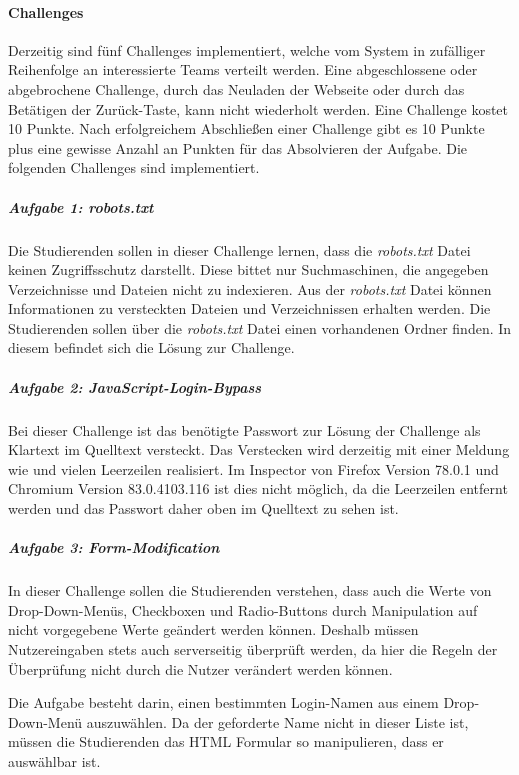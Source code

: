 \paragraph{Challenges} \label{para:Challenges}
Derzeitig sind fünf Challenges implementiert, welche vom System in zufälliger Reihenfolge an interessierte Teams verteilt werden. Eine abgeschlossene oder abgebrochene Challenge, durch das Neuladen der Webseite oder durch das Betätigen der Zurück-Taste, kann nicht wiederholt werden. Eine Challenge kostet 10 Punkte. Nach erfolgreichem Abschließen einer Challenge gibt es 10 Punkte plus eine gewisse Anzahl an Punkten für das Absolvieren der Aufgabe. Die folgenden Challenges sind implementiert. \cite[S.19-20]{abtsUeberarbeitungUndErweiterung2016}

\subparagraph{Aufgabe 1: robots.txt}\label{subpara:Aufgabe_1_robots.txt}
Die Studierenden sollen in dieser Challenge lernen, dass die \textit{robots.txt} Datei keinen Zugriffsschutz darstellt. Diese bittet nur Suchmaschinen, die angegeben Verzeichnisse und Dateien nicht zu indexieren. Aus der \textit{robots.txt} Datei können Informationen zu versteckten Dateien und Verzeichnissen erhalten werden. Die Studierenden sollen über die \textit{robots.txt} Datei einen vorhandenen Ordner finden. In diesem befindet sich die Lösung zur Challenge.

\subparagraph{Aufgabe 2: JavaScript-Login-Bypass}\label{subpara:Aufgabe_2_JavaScript-Login-Bypass}
Bei dieser Challenge ist das benötigte Passwort zur Lösung der Challenge als Klartext im Quelltext versteckt. Das Verstecken wird derzeitig mit einer Meldung wie  und vielen Leerzeilen realisiert. Im Inspector von Firefox Version 78.0.1 und Chromium Version 83.0.4103.116 ist dies nicht möglich, da die Leerzeilen entfernt werden und das Passwort daher oben im Quelltext zu sehen ist.

\subparagraph{Aufgabe 3: Form-Modification}\label{subpara:Aufgabe_3_Form-Modification}
In dieser Challenge sollen die Studierenden verstehen, dass auch die Werte von Drop-Down-Menüs, Checkboxen und Radio-Buttons durch Manipulation auf nicht vorgegebene Werte geändert werden können. Deshalb müssen Nutzereingaben stets auch serverseitig überprüft werden, da hier die Regeln der Überprüfung nicht durch die Nutzer verändert werden können.

Die Aufgabe besteht darin, einen bestimmten Login-Namen aus einem Drop-Down-Menü auszuwählen. Da der geforderte Name nicht in dieser Liste ist, müssen die Studierenden das HTML Formular so manipulieren, dass er auswählbar ist.

